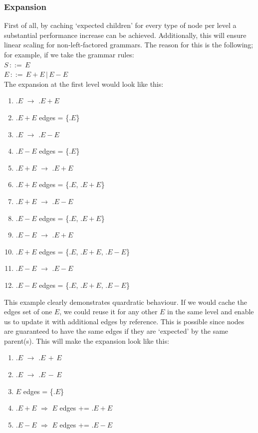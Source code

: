 \documentclass[a4paper,10pt]{article}
\begin{document}
\subsubsection{Expansion}
\label{subsec:nodeExpansionOptimization}
First of all, by caching `expected children' for every type of node per level a substantial performance increase can be achieved. Additionally, this will ensure linear scaling for non-left-factored grammars. The reason for this is the following; for example, if we take the grammar rules:\\
$S\,::=\,E$\\
$E\,::=\,E + E\,|\,E - E$\\
The expansion at the first level would look like this:
\begin{enumerate}
 \setlength{\itemsep}{0pt}
 \setlength{\parskip}{0pt}
 \setlength{\parsep}{0pt}
 
 \item $.E$ $\rightarrow$ $.E+E$
 \item $.E+E$ edges = \{$.E$\}
 \item $.E$ $\rightarrow$ $.E-E$
 \item $.E-E$ edges = \{$.E$\}
 \item $.E+E$ $\rightarrow$ $.E+E$
 \item $.E+E$ edges = \{$.E$, $.E+E$\}
 \item $.E+E$ $\rightarrow$ $.E-E$
 \item $.E-E$ edges = \{$.E$, $.E+E$\}
 \item $.E-E$ $\rightarrow$ $.E+E$
 \item $.E+E$ edges = \{$.E$, $.E+E$, $.E-E$\}
 \item $.E-E$ $\rightarrow$ $.E-E$
 \item $.E-E$ edges = \{$.E$, $.E+E$, $.E-E$\}
\end{enumerate}
This example clearly demonstrates quardratic behaviour. If we would cache the edges set of one $E$, we could reuse it for any other $E$ in the same level and enable us to update it with additional edges by reference. This is possible since nodes are guaranteed to have the same edges if they are `expected' by the same parent(s). This will make the expansion look like this:
\begin{enumerate}
 \setlength{\itemsep}{0pt}
 \setlength{\parskip}{0pt}
 \setlength{\parsep}{0pt}
 
 \item $.E$ $\rightarrow$ $.E\,+\,E$
 \item $.E$ $\rightarrow$ $.E\,-\,E$
 \item $E$ edges = \{$.E$\}
 \item $.E+E$ $\Rightarrow$ $E$ edges += $.E+E$
 \item $.E-E$ $\Rightarrow$ $E$ edges += $.E-E$
\end{enumerate}
\end{document}
